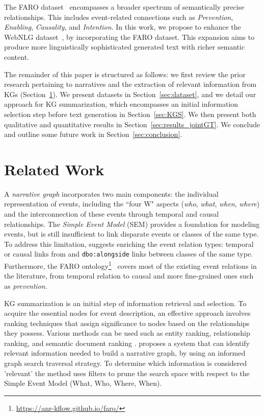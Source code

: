 \documentclass[
hf, %
]{ceurart}
\begin{document}
The FARO dataset~\cite{beyond_causality,sem_data_aug} encompasses a broader spectrum of semantically precise relationships. This includes event-related connections such as \textit{Prevention}, \textit{Enabling}, \textit{Causality}, and \textit{Intention}. In this work, we propose to enhance the WebNLG dataset~\cite{gardent-etal-2017-creating}, by incorporating the FARO dataset. This expansion aims to produce more linguistically sophisticated generated text with richer semantic content.

The remainder of this paper is structured as follows: we first review the prior research pertaining to narratives and the extraction of relevant information from KGs (Section~\ref{sec:related-work}). We present datasets in Section~\ref{sec:dataset}, and we detail our approach for KG summarization, which encompasses an initial information selection step before text generation in Section~\ref{sec:KGS}. We then present both qualitative and quantitative results in Section~\ref{sec:results_jointGT}. We conclude and outline some future work in Section~\ref{sec:conclusion}.

\section{Related Work }
\label{sec:related-work}
A \textit{narrative graph} \cite{Build_narrative} incorporates two main components: the individual representation of events, including the ``four W" aspects (\textit{who}, \textit{what}, \textit{when}, \textit{where}) and the interconnection of these events through temporal and causal relationships. The \textit{Simple Event Model} (SEM) \cite{SEM} provides a foundation for modeling events, but is still insufficient to link disparate events or classes of the same type. To address this limitation, \citeauthor{Build_narrative} \cite{Build_narrative} suggests enriching the event relation types: temporal or causal links from \citeauthor{allen} \cite{allen} and \texttt{dbo:alongside} links between classes of the same type. Furthermore, the FARO ontology\footnote{\url{https://anr-kflow.github.io/faro/}}~\cite{beyond_causality} covers most of the existing event relations in the literature, from temporal relation to causal and more fine-grained ones such as \textit{prevention}.

KG summarization is an initial step of information retrieval and selection. To acquire the essential nodes for event description, an effective approach involves ranking techniques that assign significance to nodes based on the relationships they possess. Various methods can be used such as entity ranking, relationship ranking, and semantic document ranking \cite{JINDAL2014416}. \cite{graph_traversal} proposes a system that can identify relevant information needed to build a narrative graph, by using an informed graph search traversal strategy. To determine which information is considered 'relevant' the method uses filters to prune the search space with respect to the Simple Event Model (What, Who, Where, When).
\end{document}
